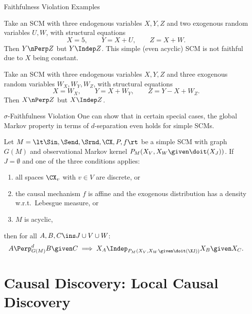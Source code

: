 \begin{frame}{Faithfulness Violation Examples}
\begin{Eg}[Determinism]
  Take an SCM with three endogenous variables $X,Y,Z$ and two exogenous random variables $U,W$, with structural equations
  $$X = 5, \qquad Y = X + U, \qquad Z = X + W.$$
  Then $Y \nPerp Z$ but $Y \Indep Z$.
  This simple (even acyclic) SCM is not faithful due to $X$ being constant.
\end{Eg}

\begin{Eg}
  Take an SCM with three endogenous variables $X,Y,Z$ and three exogenous random variables $W_X,W_Y,W_Z$, with structural equations
  $$X = W_X, \qquad Y = X + W_Y, \qquad Z = Y - X + W_Z.$$
  Then $X \nPerp Z$ but $X \Indep Z$.
\end{Eg}
\end{frame}

\begin{frame}{$\sigma$-Faithfulness Violation}
One can show that in certain special cases, the global Markov property in terms of $d$-separation even holds for simple SCMs.
\begin{Prp}
  Let $M = \lt \Sin, \Send, \Srnd, \CX, P, f \rt$ be a simple SCM with graph $G(M)$
  and observational Markov kernel $P_{M}(X_V,X_W \given \doit(X_J))$.
  If $J = \emptyset$ and one of the three conditions applies:
  \begin{enumerate}
    \item all spaces $\CX_v$ with $v \in V$ are discrete, or
    \item the causal mechanism $f$ is affine and the exogenous distribution has a density w.r.t.\ Lebesgue measure, or
    \item $M$ is acyclic,
  \end{enumerate} 
  then for all $A, B, C \ins J \cup V \cup W$:
  $$A \Perp^d_{G(M)} B \given C \implies X_A \Indep_{P_{M}(X_V,X_W \given \doit(\XJ))} X_B \given X_C.$$
\end{Prp}
\end{frame}

\part{Causal Discovery: Local Causal Discovery}
\frame{\partpage}

